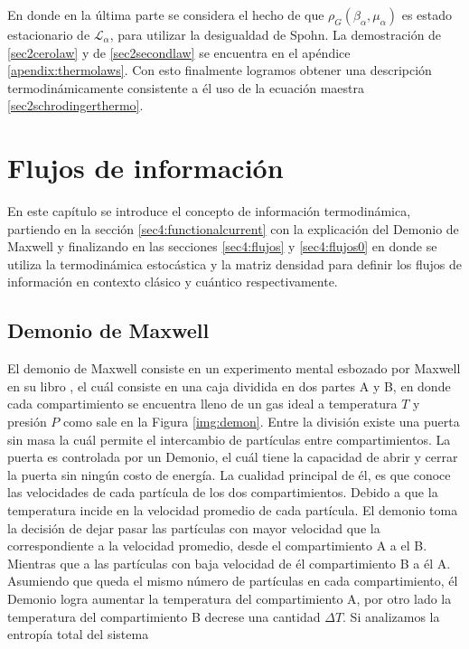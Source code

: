En donde en la última parte se considera el hecho de que $\rho_{G}(\beta_{\alpha},\mu_{\alpha})$ es estado estacionario de $\mathcal{L}_{\alpha}$, para utilizar la desigualdad de Spohn\cite{spohn2007irreversible}. La demostración de \ref{sec2cerolaw} y de \ref{sec2secondlaw} se encuentra en el apéndice \ref{apendix:thermolaws}. Con esto finalmente logramos obtener una descripción termodinámicamente consistente a él uso de la ecuación maestra \ref{sec2schrodingerthermo}.


\chapter{Flujos de información}
En este capítulo se introduce el concepto de información termodinámica, partiendo en la sección \ref{sec4:functionalcurrent} con la explicación del Demonio de Maxwell y finalizando en las secciones \ref{sec4:flujos} y \ref{sec4:flujos0} en donde se utiliza la termodinámica estocástica y la matriz densidad para definir los flujos de información en contexto clásico y cuántico respectivamente.
\section{Demonio de Maxwell}
El demonio de Maxwell consiste en un experimento mental esbozado por Maxwell en su libro \cite{Maxwell_1871}, el cuál consiste en una caja dividida en dos partes A y B, en donde cada compartimiento se encuentra lleno de un gas ideal a temperatura $T$ y presión $P$ como sale en la Figura \ref{img:demon}. Entre la división existe una puerta sin masa la cuál permite el intercambio de partículas entre compartimientos. La puerta es controlada por un Demonio, el cuál tiene la capacidad de abrir y cerrar la puerta sin ningún costo de energía. La cualidad principal de él, es que conoce las velocidades de cada partícula de los dos compartimientos. Debido a que la temperatura incide en la velocidad promedio de cada partícula. El demonio toma la decisión de dejar pasar las partículas con mayor velocidad que la correspondiente a la velocidad promedio, desde el compartimiento A a el B. Mientras que a las partículas con baja velocidad de él compartimiento B a él A. Asumiendo que queda el mismo número de partículas en cada compartimiento, él Demonio logra aumentar la temperatura del compartimiento A, por otro lado la temperatura del compartimiento B decrese una cantidad $\Delta T$. Si analizamos la entropía total del sistema


